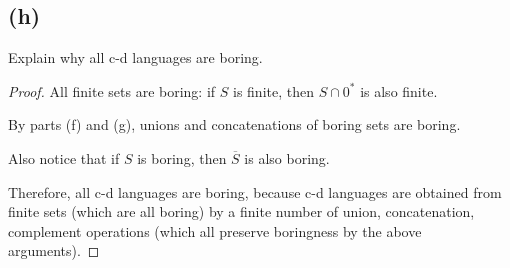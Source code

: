 \documentclass[14pt]{extarticle}
\begin{document}
\subsection{(h)}
Explain why all c-d languages are boring.
\begin{proof}
All finite sets are boring: if $S$ is finite, then $S \cap 0^*$ is also finite.

By parts (f) and (g), unions and concatenations of boring sets are boring.

Also notice that if $S$ is boring, then $\overline{S}$ is also boring.

Therefore, all c-d languages are boring, because c-d languages are obtained from finite sets (which are all boring) by a finite number of union, concatenation, complement operations (which all preserve boringness by the above arguments).
\end{proof}
\end{document}
